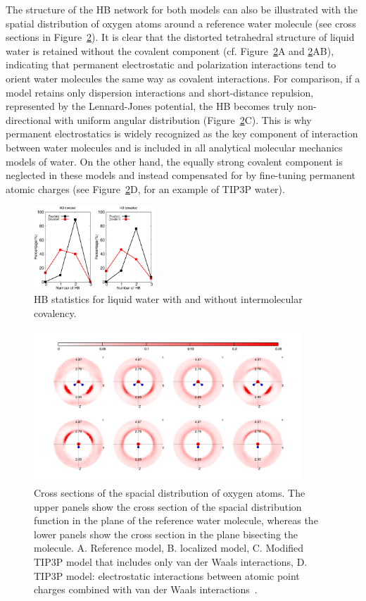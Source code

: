 \documentclass[aps,prl,reprint,amsmath,amssymb]{revtex4-1}
\begin{document}
The structure of the HB network for both models can also be illustrated with the spatial distribution of oxygen atoms around a reference water molecule (see cross sections in Figure~\ref{Fig:SDF}). 
It is clear that the distorted tetrahedral structure of liquid water is retained without the covalent component (cf. Figure~\ref{Fig:SDF}A and \ref{Fig:SDF}AB), indicating that permanent electrostatic and polarization interactions tend to orient water molecules the same way as covalent interactions. 
For comparison, if a model retains only dispersion interactions and short-distance repulsion, represented by the Lennard-Jones potential, the HB becomes truly non-directional with uniform angular distribution (Figure~\ref{Fig:SDF}C). 
This is why permanent electrostatics is widely recognized as the key component of interaction between water molecules and is included in all analytical molecular mechanics models of water. 
On the other hand, the equally strong covalent component is neglected in these models and instead compensated for by fine-tuning permanent atomic charges (see Figure~\ref{Fig:SDF}D, for an example of TIP3P water). 

\begin{figure}
\includegraphics[width=0.4\textwidth]{new_hbstat}
\caption{HB statistics for liquid water with and without intermolecular covalency.}\label{fig:HBstat}
\end{figure}

\begin{figure}
\includegraphics[width=0.9\textwidth]{SDF}
\caption{Cross sections of the spacial distribution of oxygen atoms. 
The upper panels show the cross section of the spacial distribution function in the plane of the reference water molecule, whereas the lower panels show the cross section in the plane bisecting the molecule. 
A. Reference model, B. localized model, C. Modified TIP3P model that includes only van der Waals interactions, D. TIP3P model: electrostatic interactions between atomic point charges combined with van der Waals interactions~\cite{TIP3P}.} \label{Fig:SDF}
\end{figure}
\end{document}
